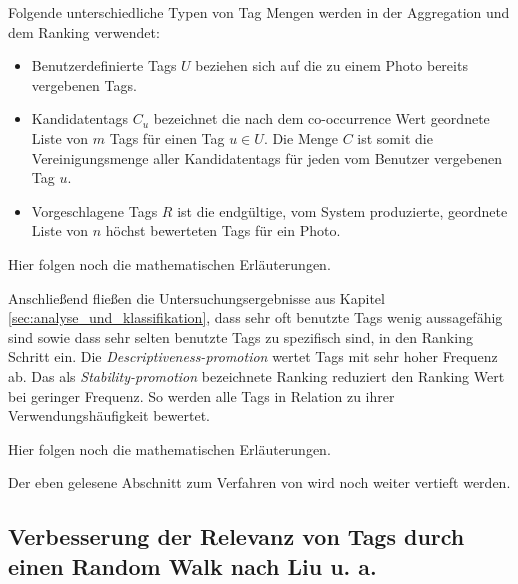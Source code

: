 Folgende unterschiedliche Typen von Tag Mengen werden in der Aggregation und dem Ranking verwendet:

\begin{itemize}
  \item Benutzerdefinierte Tags $U$ beziehen sich auf die zu einem Photo bereits vergebenen Tags.
  \item Kandidatentags $C_u$ bezeichnet die nach dem co-occurrence Wert geordnete Liste von $m$ Tags für einen Tag $u \in U$. Die Menge $C$ ist somit die Vereinigungsmenge aller Kandidatentags für jeden vom Benutzer vergebenen Tag $u$.
  \item Vorgeschlagene Tags $R$ ist die endgültige, vom System produzierte, geordnete Liste von $n$ höchst bewerteten Tags für ein Photo.
\end{itemize}



Hier folgen noch die mathematischen Erläuterungen.

Anschließend fließen die Untersuchungsergebnisse aus Kapitel \ref{sec:analyse_und_klassifikation}, dass sehr oft benutzte Tags wenig aussagefähig sind sowie dass sehr selten benutzte Tags zu spezifisch sind, in den Ranking Schritt ein. Die \emph{Descriptiveness-promotion} wertet Tags mit sehr hoher Frequenz ab. Das als \emph{Stability-promotion} bezeichnete Ranking reduziert den Ranking Wert bei geringer Frequenz. So werden alle Tags in Relation zu ihrer Verwendungshäufigkeit bewertet.

Hier folgen noch die mathematischen Erläuterungen.

Der eben gelesene Abschnitt zum Verfahren von \cite{collectiveKnowledge} wird noch weiter vertieft werden.


\subsection{Verbesserung der Relevanz von Tags durch einen Random Walk nach Liu u. a.} %
\label{sub:verbesserung_der_relevanz_durch_einen_random_walk}

%     

